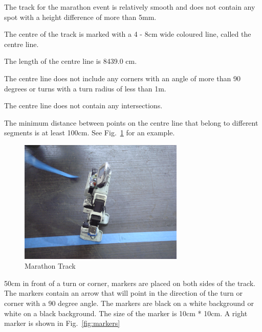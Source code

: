 \documentclass[12pt]{hurocup}
\begin{document}
\begin{lawlist}[MR]

\item The track for the marathon event is relatively smooth and does
  not contain any spot with a height difference of more than 5mm.

\item The centre of the track is marked with a 4 - 8cm wide coloured
line, called the centre line.

\item The length of the centre line is 8439.0 cm.

\item The centre line does not include any corners with an
 angle of more than 90 degrees or turns with a turn radius of less
 than 1m.

\item The centre line does not contain any intersections.

\item The minimum distance between points on the centre line that
 belong to different segments is at least 100cm.  See
 Fig.~\ref{fig:marathon-track} for an example.

\begin{figure}
  \begin{center}
    \includegraphics[width=0.7\textwidth]{Figures/marathon-track}
  \end{center}
  \caption{Marathon Track}
  \label{fig:marathon-track}
\end{figure}

\item 50cm in front of a turn or corner, markers are placed on both
  sides of the track. The markers contain an arrow that will point in
  the direction of the turn or corner with a 90 degree angle. The
  markers are black on a white background or white on a black
  background. The size of the marker is 10cm * 10cm. A right marker is
  shown in Fig.~\ref{fig:markers}


\end{lawlist}
\end{document}
